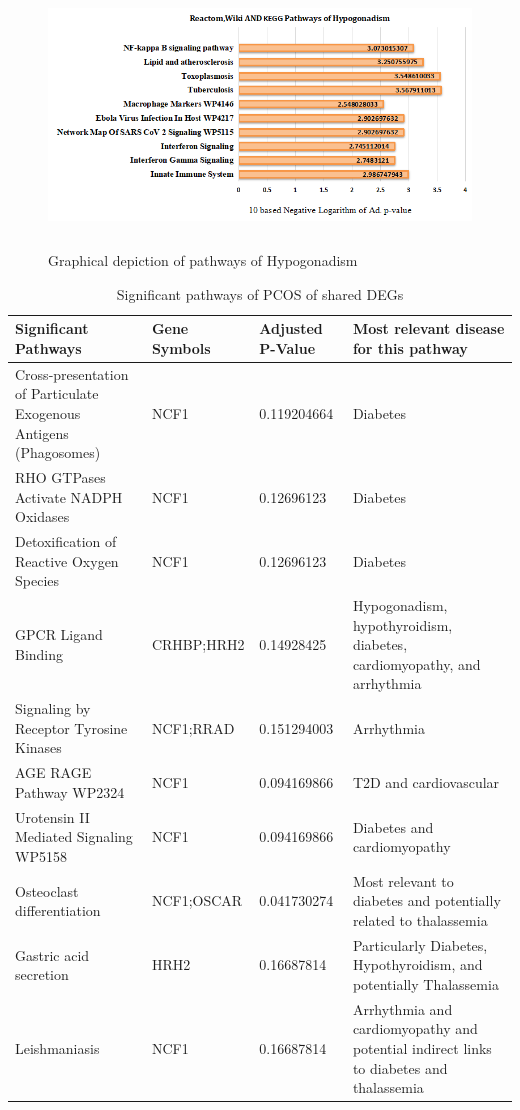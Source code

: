 \begin{figure}[H]
\centering
\includegraphics[height=7cm]{./fig/fig4_5.png} 
\centering
\caption{Graphical depiction of   pathways of Hypogonadism}
\label{Significant_pathways_hypogonadism}
\end{figure}

\newpage

\begin{longtable}{|p{4cm}|p{2.6cm}|p{2cm}|p{4cm}|}
    \caption[Significant pathways of PCOS of shared DEGs]{Significant pathways of PCOS of shared DEGs}\label{tab:significant_pathways_pcos} \\
    \hline
    Significant Pathways & Gene Symbols & Adjusted P-Value & Most relevant disease for this pathway \\
    \hline
    Cross-presentation of Particulate Exogenous Antigens (Phagosomes) & NCF1 & 0.119204664 & Diabetes \\
    \hline
    RHO GTPases Activate NADPH Oxidases & NCF1 & 0.12696123 & Diabetes \\
    \hline
    Detoxification of Reactive Oxygen Species & NCF1 & 0.12696123 & Diabetes \\
    \hline
    GPCR Ligand Binding & CRHBP;HRH2 & 0.14928425 & Hypogonadism, hypothyroidism, diabetes, cardiomyopathy, and arrhythmia \\
    \hline
    Signaling by Receptor Tyrosine Kinases & NCF1;RRAD & 0.151294003 & Arrhythmia \\
    \hline
    AGE RAGE Pathway WP2324 & NCF1 & 0.094169866 & T2D and cardiovascular \\
    \hline
    Urotensin II Mediated Signaling WP5158 & NCF1 & 0.094169866 & Diabetes and cardiomyopathy \\
    \hline
    Osteoclast differentiation & NCF1;OSCAR & 0.041730274 & Most relevant to diabetes and potentially related to thalassemia \\
    \hline
    Gastric acid secretion & HRH2 & 0.16687814 & Particularly Diabetes, Hypothyroidism, and potentially Thalassemia \\
    \hline
    Leishmaniasis & NCF1 & 0.16687814 & Arrhythmia and cardiomyopathy and potential indirect links to diabetes and thalassemia \\
    \hline
\end{longtable}

